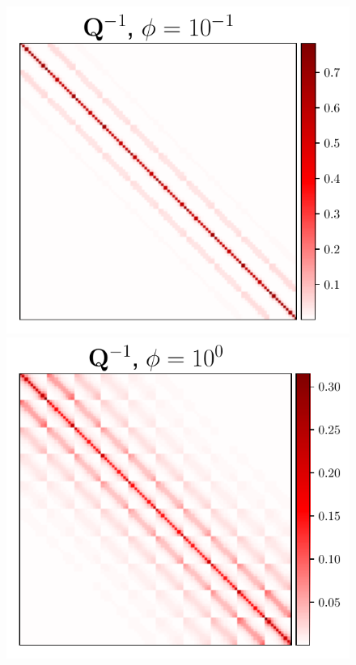 \documentclass[nohypdvips,onefignum,onetabnum]{siamart171218}
\begin{document}
\begin{figure}
  \mbox{{\includegraphics[scale=0.43]{images/simu2_ex1_invA_phi_0.pdf}}}
  \mbox{{\includegraphics[scale=0.43]{images/simu2_ex1_invA_phi_1.pdf}}}

\end{figure}
\end{document}
